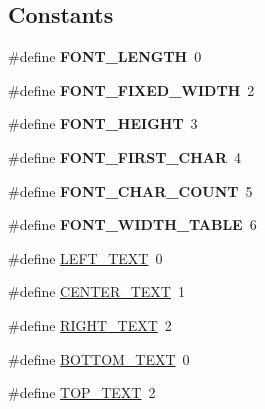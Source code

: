 \subsection*{Constants}
\begin{CompactItemize}
\item 
\hypertarget{group__graphic__device__font_ge06dc7b9804bb102859f0e32754e79a5}{
\#define \textbf{FONT\_\-LENGTH}~0}
\label{group__graphic__device__font_ge06dc7b9804bb102859f0e32754e79a5}

\item 
\hypertarget{group__graphic__device__font_gfc65866121cd2eba3caa85d2946eeec0}{
\#define \textbf{FONT\_\-FIXED\_\-WIDTH}~2}
\label{group__graphic__device__font_gfc65866121cd2eba3caa85d2946eeec0}

\item 
\hypertarget{group__graphic__device__font_g33f4fac49f2a5e27e2857eb27f054510}{
\#define \textbf{FONT\_\-HEIGHT}~3}
\label{group__graphic__device__font_g33f4fac49f2a5e27e2857eb27f054510}

\item 
\hypertarget{group__graphic__device__font_gbf840ca631179d25994d5f1dc3594646}{
\#define \textbf{FONT\_\-FIRST\_\-CHAR}~4}
\label{group__graphic__device__font_gbf840ca631179d25994d5f1dc3594646}

\item 
\hypertarget{group__graphic__device__font_g4546cd12e3ae03bca0659ed77eeb872e}{
\#define \textbf{FONT\_\-CHAR\_\-COUNT}~5}
\label{group__graphic__device__font_g4546cd12e3ae03bca0659ed77eeb872e}

\item 
\hypertarget{group__graphic__device__font_ge6bf0901cff58e47324da9487d0ee938}{
\#define \textbf{FONT\_\-WIDTH\_\-TABLE}~6}
\label{group__graphic__device__font_ge6bf0901cff58e47324da9487d0ee938}

\item 
\#define \hyperlink{group__graphic__device__font_geaf74eaabed8649b362d27e238658343}{LEFT\_\-TEXT}~0
\item 
\#define \hyperlink{group__graphic__device__font_gd0ae9e6dc7894a5b6b1e36fc5260b862}{CENTER\_\-TEXT}~1
\item 
\#define \hyperlink{group__graphic__device__font_g17e416c21fb4d19bc55179c55d452de9}{RIGHT\_\-TEXT}~2
\item 
\#define \hyperlink{group__graphic__device__font_g02b7607c323731f6b5d4c4aba6eb8f70}{BOTTOM\_\-TEXT}~0
\item 
\#define \hyperlink{group__graphic__device__font_gffe790b2fe3846e872da3498e2ec2f43}{TOP\_\-TEXT}~2
\end{CompactItemize}


